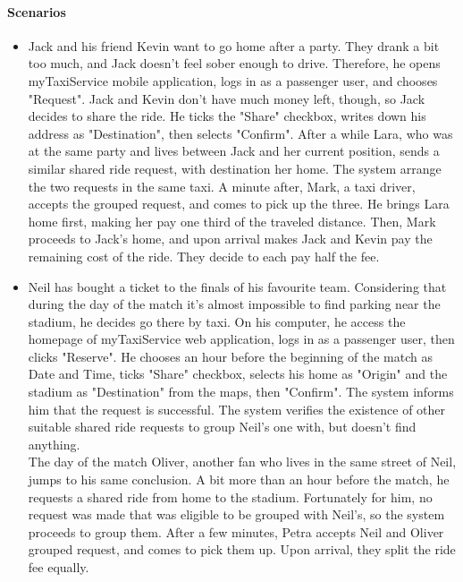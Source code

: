 \paragraph{Scenarios}
\begin{itemize}
	\item Jack and his friend Kevin want to go home after a party. They drank a bit too much, and Jack doesn't feel sober enough to drive. Therefore, he opens myTaxiService mobile application, logs in as a passenger user, and chooses "Request". Jack and Kevin don't have much money left, though, so Jack decides to share the ride. He ticks the "Share" checkbox, writes down his address as "Destination", then selects "Confirm". After a while Lara, who was at the same party and lives between Jack and her current position, sends a similar shared ride request, with destination her home. The system arrange the two requests in the same taxi. A minute after, Mark, a taxi driver, accepts the grouped request, and comes to pick up the three. He brings Lara home first, making her pay one third of the traveled distance. Then, Mark proceeds to Jack's home, and upon arrival makes Jack and Kevin pay the remaining cost of the ride. They decide to each pay half the fee.
	
	\item Neil has bought a ticket to the finals of his favourite team. Considering that during the day of the match it's almost impossible to find parking near the stadium, he decides go there by taxi. On his computer, he access the homepage of myTaxiService web application, logs in as a passenger user, then clicks "Reserve". He chooses an hour before the beginning of the match as Date and Time, ticks "Share" checkbox, selects his home as "Origin" and the stadium as "Destination" from the maps, then "Confirm". The system informs him that the request is successful. The system verifies the existence of other suitable shared ride requests to group Neil's one with, but doesn't find anything.\\
The day of the match Oliver, another fan who lives in the same street of Neil, jumps to his same conclusion. A bit more than an hour before the match, he requests a shared ride from home to the stadium. Fortunately for him, no request was made that was eligible to be grouped with Neil's, so the system proceeds to group them. After a few minutes, Petra accepts Neil and Oliver grouped request, and comes to pick them up. Upon arrival, they split the ride fee equally.
\end{itemize}

